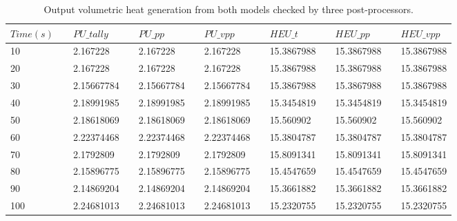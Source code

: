 \documentclass{anstrans}
\begin{document}
\begin{table*}[ht]
    \centering
    \caption{Output volumetric heat generation from both models checked by three post-processors.}
    \begin{tabular}{lllllllllllll}\toprule 
 $Time (s)$ & & $PU\_tally$ & & $PU\_pp$  & & $PU\_vpp$  & & $HEU\_t$ & & $HEU\_pp$ & & $HEU\_vpp$ \\ [-0.25ex]
\midrule
 10  &  & 2.167228  & & 2.167228  & & 2.167228  & & 15.3867988 & & 15.3867988 & & 15.3867988 \\ [-0.25ex]
 20  &  & 2.167228 &  & 2.167228  & & 2.167228  & & 15.3867988 & & 15.3867988 & & 15.3867988 \\ [-0.25ex]
 30  & & 2.15667784 & & 2.15667784 & & 2.15667784 & & 15.3867988 & & 15.3867988 & & 15.3867988 \\ [-0.25ex]
 40  &  & 2.18991985 & & 2.18991985 & & 2.18991985 & & 15.3454819 & & 15.3454819 & & 15.3454819 \\ [-0.25ex]
 50  &  & 2.18618069 & & 2.18618069 & & 2.18618069 & & 15.560902  & & 15.560902  & & 15.560902 \\[-0.25ex]
 60  &  & 2.22374468 & & 2.22374468 & & 2.22374468 & & 15.3804787 & & 15.3804787 & & 15.3804787 \\ [-0.25ex]
 70  &  & 2.1792809  & & 2.1792809  & & 2.1792809  & & 15.8091341 & & 15.8091341 & & 15.8091341 \\ [-0.25ex]
 80  &  & 2.15896775 & & 2.15896775 & & 2.15896775 & & 15.4547659 & & 15.4547659 & & 15.4547659 \\ [-0.25ex]
 90  &  & 2.14869204 & & 2.14869204 & & 2.14869204 & & 15.3661882 & & 15.3661882 & & 15.3661882\\ [-0.25ex]
 100 &  & 2.24681013 & & 2.24681013 & & 2.24681013 & & 15.2320755 & & 15.2320755 & & 15.2320755 \\ [-0.25ex]
\bottomrule
	\end{tabular}
  \label{tab:transfercheck}
\end{table*}
\end{document}
